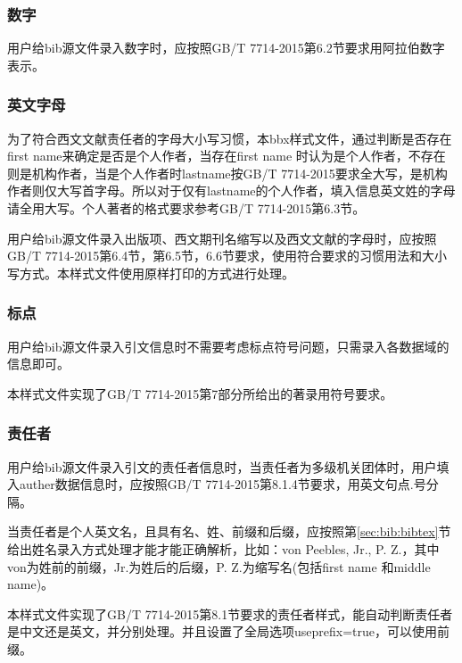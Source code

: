 \subsubsection{数字}

\begin{property}{}{}
用户给bib源文件录入数字时，应按照GB/T 7714-2015第6.2节要求用阿拉伯数字表示。
\end{property}

\subsubsection{英文字母}

\begin{property}{}{}
为了符合西文文献责任者的字母大小写习惯，本bbx样式文件，通过判断是否存在first name来确定是否是个人作者，当存在first name 时认为是个人作者，不存在则是机构作者，当是个人作者时lastname按GB/T 7714-2015要求全大写，是机构作者则仅大写首字母。所以对于仅有lastname的个人作者，填入信息英文姓的字母请全用大写。个人著者的格式要求参考GB/T 7714-2015第6.3节。

用户给bib源文件录入出版项、西文期刊名缩写以及西文文献的字母时，应按照GB/T 7714-2015第6.4节，第6.5节，6.6节要求，使用符合要求的习惯用法和大小写方式。本样式文件使用原样打印的方式进行处理。
\end{property}

\subsubsection{标点}

\begin{property}{}{}
用户给bib源文件录入引文信息时不需要考虑标点符号问题，只需录入各数据域的信息即可。

本样式文件实现了GB/T 7714-2015第7部分所给出的著录用符号要求。
\end{property}

\subsubsection{责任者}

\begin{property}{}{}
用户给bib源文件录入引文的责任者信息时，当责任者为多级机关团体时，用户填入auther数据信息时，应按照GB/T 7714-2015第8.1.4节要求，用英文句点.号分隔。

当责任者是个人英文名，且具有名、姓、前缀和后缀，应按照第\ref{sec:bib:bibtex}节给出姓名录入方式处理才能才能正确解析，比如：von Peebles, Jr., P. Z.，其中von为姓前的前缀，Jr.为姓后的后缀，P. Z.为缩写名(包括first name 和middle name)。

本样式文件实现了GB/T 7714-2015第8.1节要求的责任者样式，能自动判断责任者是中文还是英文，并分别处理。并且设置了全局选项useprefix=true，可以使用前缀。
\end{property}


